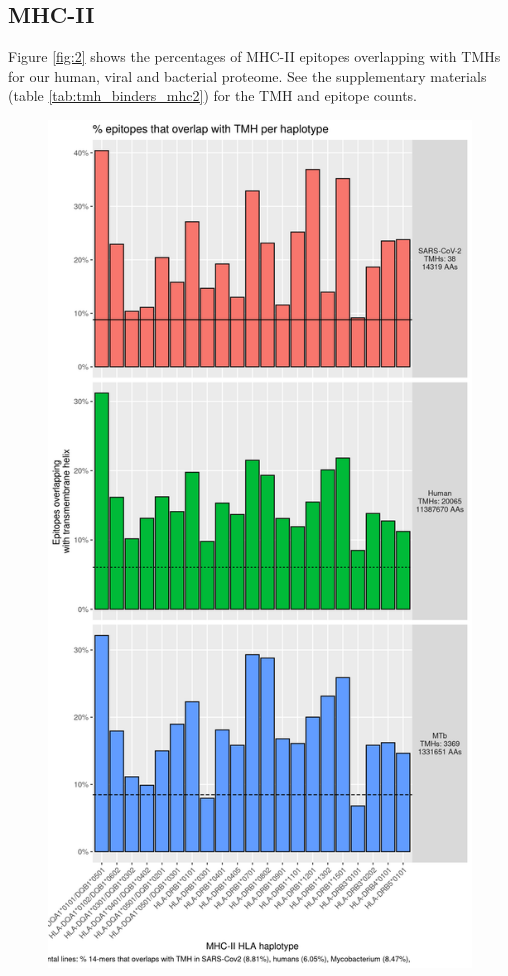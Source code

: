 \subsection{MHC-II}

Figure \ref{fig:2} shows the percentages of MHC-II epitopes overlapping 
with TMHs for our human, viral and bacterial proteome.
See the supplementary materials (table \ref{tab:tmh_binders_mhc2}) 
for the TMH and epitope counts.

\begin{figure}[!htbp]
  \includegraphics[height=0.9\textheight]{bbbq_1_smart_results/fig_f_tmh_mhc2_2_grid.png}

\end{figure}
